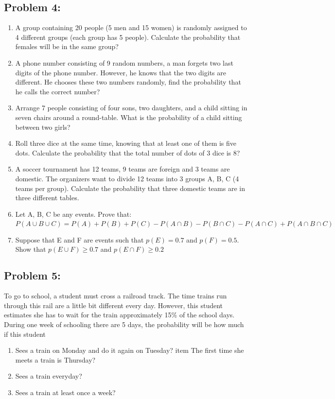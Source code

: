\documentclass[12pt,en,a4paper]{article}
\begin{document}
	\subsection*{Problem 4:}
	\begin{enumerate}
		\item A group containing 20 people (5 men and 15 women) is randomly assigned to 4 different groups (each group has 5 people). Calculate the probability that females will be in the same group?
		\item A phone number consisting of 9 random numbers, a man forgets two last digits of the phone number. However, he knows that the two digits are different. He chooses these two numbers randomly, find the probability that he calls the correct number?
		\item Arrange 7 people consisting of four sons, two daughters, and a child sitting in seven chairs around a round-table. What is the probability of a child sitting between two girls?
		\item Roll three dice at the same time, knowing that at least one of them is five dots. Calculate the probability that the total number of dots of 3 dice is 8?
		\item A soccer tournament has 12 teams, 9 teams are foreign and 3 teams are domestic. The organizers want to divide 12 teams into 3 groups A, B, C (4 teams per group). Calculate the probability that three domestic teams are in three different tables.
		\item Let A, B, C be any events. Prove that: \\
		\begin{math}
			P(A \cup B \cup C) = P(A) + P(B) + P(C) - P(A \cap B) - P(B \cap C) - P(A \cap C) + P(A \cap B \cap C)
		\end{math}
		\item Suppose that E and F are events such that $p(E) = 0.7$ and $p(F) = 0.5$. Show that $p(E \cup F) \geq 0.7$ and $p(E \cap F) \geq 0.2$
	\end{enumerate}
	
	\subsection*{Problem 5:}
	To go to school, a student must cross a railroad track. The time trains run through this rail are a little bit different every day. However, this student estimates she has to wait for the train approximately 15\% of the school days. During one week of schooling there are 5 days, the probability will be how much if this student
	\begin{enumerate}
		\item Sees a train on Monday and do it again on Tuesday?
		item The first time she meets a train is Thursday?
		\item Sees a train everyday?
		\item Sees a train at least once a week?
	\end{enumerate}
	
\end{document}
